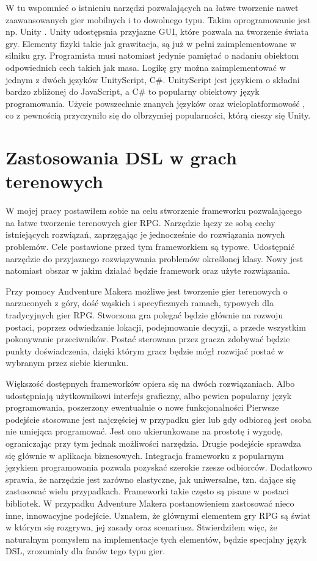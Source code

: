 \documentclass	{xmgr}
\begin{document}
W tu wspomnieć o istnieniu narzędzi pozwalających na łatwe tworzenie nawet zaawansowanych gier mobilnych i to dowolnego typu. Takim oprogramowanie jest np. Unity \cite{Unity3D:2017:Doc}. Unity udostępsnia przyjazne GUI, które pozwala na tworzenie świata gry. Elementy fizyki takie jak grawitacja, są już w pełni zaimplementowane w silniku gry. Programista musi natomiast jedynie pamiętać o nadaniu obiektom odpowiednich cech takich jak masa. Logikę gry można zaimplementować w jednym z dwóch języków UnityScript, C\#. UnityScript jest językiem o składni bardzo zbliżonej do JavaScript, a C\# to popularny obiektowy język programowania. Użycie powszechnie znanych języków oraz wieloplatformowość , co z pewnością przyczyniło się do olbrzymiej popularności, którą cieszy się Unity.

\section{Zastosowania DSL w grach terenowych}

W mojej pracy postawiłem sobie na celu stworzenie frameworku pozwalającego na łatwe tworzenie terenowych gier RPG. Narzędzie łączy ze sobą cechy istniejących rozwiązań, zaprzęgając je jednocześnie do rozwiązania nowych problemów. Cele postawione przed tym frameworkiem są typowe. Udostępnić narzędzie do przyjaznego rozwiązywania problemów określonej klasy. Nowy jest natomiast obszar w jakim działać będzie framework oraz użyte rozwiązania.

Przy pomocy Andventure Makera możliwe jest tworzenie gier terenowych o narzuconych z góry, dość wąskich i specyficznych ramach, typowych dla tradycyjnych gier RPG. Stworzona gra polegać będzie głównie na rozwoju postaci, poprzez odwiedzanie lokacji, podejmowanie decyzji, a przede wszystkim pokonywanie przeciwników. Postać sterowana przez gracza zdobywać będzie punkty doświadczenia, dzięki którym gracz będzie mógł rozwijać postać w wybranym przez siebie kierunku. 

Większość dostępnych frameworków opiera się na dwóch rozwiązaniach. Albo udostępniają użytkownikowi interfejs graficzny, albo pewien popularny język programowania, poszerzony ewentualnie o nowe funkcjonalności Pierwsze podejście stosowane jest najczęściej w przypadku gier lub gdy odbiorcą jest osoba nie umiejąca programować. Jest ono ukierunkowane na prostotę i wygodę, ograniczając przy tym jednak możliwości narzędzia. Drugie podejście sprawdza się głównie w aplikacja biznesowych. Integracja frameworku z popularnym językiem programowania pozwala pozyskać szerokie rzesze odbiorców. Dodatkowo sprawia, że narzędzie jest zarówno elastyczne, jak uniwersalne, tzn. dające się zastosować wielu przypadkach. Frameworki takie często są pisane w postaci bibliotek.
W przypadku Adventure Makera postanowieniem zastosować nieco inne, innowacyjne podejście. Uznałem, że głównymi elementem gry RPG są świat w którym się rozgrywa, jej zasady oraz scenariusz. Stwierdziłem więc, że naturalnym pomysłem na implementacje tych elementów, będzie specjalny język DSL, zrozumiały dla fanów tego typu gier.
\end{document}
